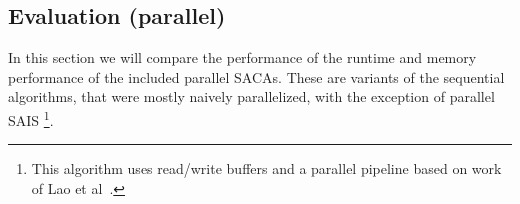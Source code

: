 \FloatBarrier

\subsection{Evaluation (parallel)}

In this section we will compare the performance of the runtime and memory performance of the included parallel SACAs.
These are variants of the sequential algorithms, that were mostly naively parallelized, with the exception of parallel SAIS
\footnote{This algorithm uses read/write buffers and a parallel pipeline based on work of Lao et al~\cite{psais}.}.

\begin{figure}[!h]
    \centering
\end{figure}
